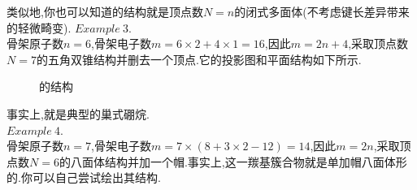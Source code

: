 \documentclass{ctexart}
\begin{document}
类似地,你也可以知道的结构就是顶点数$N=n$的闭式多面体(不考虑键长差异带来的轻微畸变).
$\mathit{Example\ 3.}$\ \\
\indent 骨架原子数$n=6$,骨架电子数$m=6\times2+4\times1=16$,因此$m=2n+4$,采取顶点数$N=7$的五角双锥结构并删去一个顶点.它的投影图和平面结构如下所示.\vspace{-10pt}
\begin{figure}[H]
    \centering
    \caption{的结构}
\end{figure}
事实上,就是典型的巢式硼烷.\\
$\mathit{Example\ 4.}$\ \\
\indent 骨架原子数$n=7$,骨架电子数$m=7\times(8+3\times2-12)=14$,因此$m=2n$,采取顶点数$N=6$的八面体结构并加一个帽.事实上,这一羰基簇合物就是单加帽八面体形的.你可以自己尝试绘出其结构.\\
\end{document}
